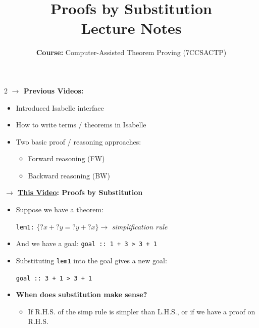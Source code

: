 \documentclass[10pt,a4paper]{article}
\title{\textbf{\huge Proofs by Substitution}\\[0.3em]
\large Lecture Notes}
\author{\textbf{Course:} Computer-Assisted Theorem Proving (7CCSACTP)}
\date{}
\begin{document}
\maketitle
\vspace{-1.5em}

\begin{tcolorbox}[title=Context \& Concept of Substitution]
\begin{multicols}{2}
\textbf{$\rightarrow$ Previous Videos:}
\begin{itemize}[leftmargin=1.2em, itemsep=2pt]
    \item Introduced Isabelle interface
    \item How to write terms / theorems in Isabelle
    \item Two basic proof / reasoning approaches:
    \begin{itemize}[leftmargin=1em, label=$\bullet$]
        \item Forward reasoning (FW)
        \item Backward reasoning (BW)
    \end{itemize}
\end{itemize}

\columnbreak

\textbf{$\rightarrow$ \underline{This Video}: Proofs by Substitution}
\begin{itemize}[leftmargin=1.2em, itemsep=2pt]
    \item Suppose we have a theorem:
    \begin{center}
    \texttt{lem1:} $\{?x + ?y = ?y + ?x\} \longrightarrow$ \textit{simplification rule}
    \end{center}
    \item And we have a goal: \quad \texttt{goal :: 1 + 3 > 3 + 1}
    \item Substituting \texttt{lem1} into the goal gives a new goal:
    \begin{center}
    \texttt{goal :: 3 + 1 > 3 + 1}
    \end{center}
    \item \textbf{When does substitution make sense?}
    \begin{itemize}[leftmargin=1em, label=$\bullet$]
        \item If R.H.S. of the simp rule is simpler than L.H.S., or if we have a proof on R.H.S.
    \end{itemize}
\end{itemize}
\end{multicols}
\end{tcolorbox}
\end{document}
